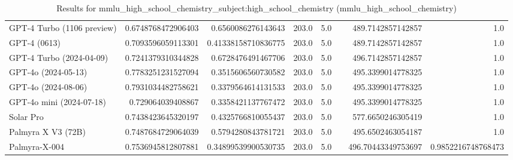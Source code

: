 \begin{table}[htp]
{\begin{tabular}{lrrrrrrr}
GPT-4 Turbo (1106 preview) & 0.6748768472906403 & 0.6560086276143643 & 203.0 & 5.0 &  & 489.7142857142857 & 1.0 \\
GPT-4 (0613) & 0.7093596059113301 & 0.41338158710836775 & 203.0 & 5.0 &  & 489.7142857142857 & 1.0 \\
GPT-4 Turbo (2024-04-09) & 0.7241379310344828 & 0.6728476491467706 & 203.0 & 5.0 &  & 496.7142857142857 & 1.0 \\
GPT-4o (2024-05-13) & 0.7783251231527094 & 0.3515606560730582 & 203.0 & 5.0 &  & 495.3399014778325 & 1.0 \\
GPT-4o (2024-08-06) & 0.7931034482758621 & 0.3379564614131533 & 203.0 & 5.0 &  & 495.3399014778325 & 1.0 \\
GPT-4o mini (2024-07-18) & 0.729064039408867 & 0.3358421137767472 & 203.0 & 5.0 &  & 495.3399014778325 & 1.0 \\
Solar Pro & 0.7438423645320197 & 0.4325766810055437 & 203.0 & 5.0 &  & 577.6650246305419 & 1.0 \\
Palmyra X V3 (72B) & 0.7487684729064039 & 0.5794280843781721 & 203.0 & 5.0 &  & 495.6502463054187 & 1.0 \\
Palmyra-X-004 & 0.7536945812807881 & 0.34899539900530735 & 203.0 & 5.0 &  & 496.70443349753697 & 0.9852216748768473 \\
\bottomrule
\end{tabular}}
\caption{Results for mmlu_high_school_chemistry_subject:high_school_chemistry (mmlu_high_school_chemistry)}
\label{fig:mmlu_high_school_chemistry_subject:high_school_chemistry (mmlu_high_school_chemistry)}
\end{table}